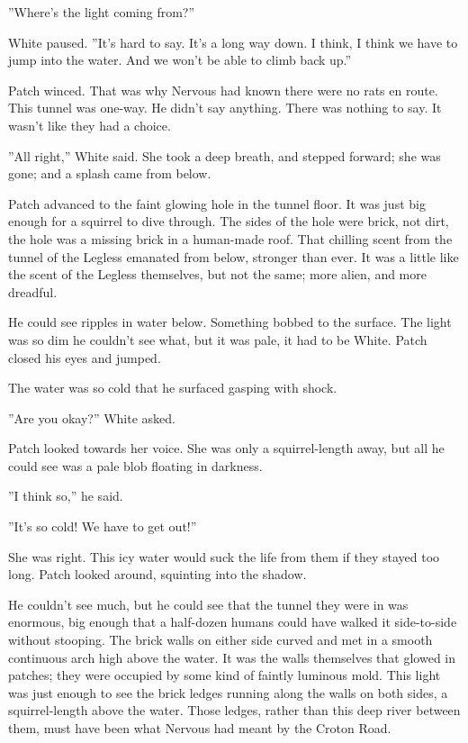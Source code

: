 \documentclass[11pt]{article}
\begin{document}
 ''Where's the light coming from?''\par
 White paused. ''It's hard to say. It's a long way down. I think, I think we have to jump into the water. And we won't be able to climb back up.''\par
 Patch winced. That was why Nervous had known there were no rats en route. This tunnel was one-way. He didn't say anything. There was nothing to say. It wasn't like they had a choice.\par
 ''All right,'' White said. She took a deep breath, and stepped forward; she was gone; and a splash came from below.\par
 Patch advanced to the faint glowing hole in the tunnel floor. It was just big enough for a squirrel to dive through. The sides of the hole were brick, not dirt, the hole was a missing brick in a human-made roof. That chilling scent from the tunnel of the Legless emanated from below, stronger than ever. It was a little like the scent of the Legless themselves, but not the same; more alien, and more dreadful.\par
He could see ripples in water below. Something bobbed to the surface. The light was so dim he couldn't see what, but it was pale, it had to be White. Patch closed his eyes and jumped.\par
The water was so cold that he surfaced gasping with shock.\par
 ''Are you okay?'' White asked.\par
 Patch looked towards her voice. She was only a squirrel-length away, but all he could see was a pale blob floating in darkness.\par
 ''I think so,'' he said.\par
 ''It's so cold! We have to get out!''\par
 She was right. This icy water would suck the life from them if they stayed too long. Patch looked around, squinting into the shadow.\par
 He couldn't see much, but he could see that the tunnel they were in was enormous, big enough that a half-dozen humans could have walked it side-to-side without stooping. The brick walls on either side curved and met in a smooth continuous arch high above the water. It was the walls themselves that glowed in patches; they were occupied by some kind of faintly luminous mold. This light was just enough to see the brick ledges running along the walls on both sides, a squirrel-length above the water. Those ledges, rather than this deep river between them, must have been what Nervous had meant by the Croton Road.\par
\end{document}
